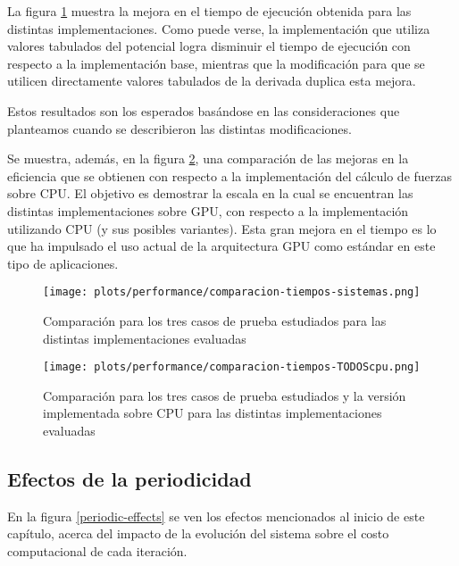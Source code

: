 La figura \ref{time-compare} muestra la mejora en el tiempo de ejecución obtenida para las distintas implementaciones.
Como puede verse, la implementación que utiliza valores tabulados del potencial logra disminuir el tiempo de ejecución con respecto a la implementación base, 
mientras que la modificación para que se utilicen directamente valores tabulados de la derivada duplica esta mejora.

Estos resultados son los esperados basándose en las consideraciones que planteamos cuando se describieron las distintas modificaciones. 

Se muestra, además, en la figura \ref{time-compare-cpu}, una comparación de las mejoras en la eficiencia que se obtienen con respecto a la implementación del cálculo de fuerzas sobre CPU. 
El objetivo es demostrar la escala en la cual se encuentran las distintas implementaciones sobre GPU, con respecto a la implementación utilizando CPU (y sus posibles variantes). 
Esta gran mejora en el tiempo es lo que ha impulsado el uso actual de la arquitectura GPU como estándar en este tipo de aplicaciones.




\begin{figure}[htbp]
\centering
   \texttt{[image: plots/performance/comparacion-tiempos-sistemas.png]}
 \caption{Comparaci\'on para los tres casos de prueba estudiados para las distintas implementaciones evaluadas}
 \label{time-compare}
\end{figure}




\begin{figure}[htbp]
\centering
   \texttt{[image: plots/performance/comparacion-tiempos-TODOScpu.png]}
 \caption{Comparaci\'on para los tres casos de prueba estudiados y la versión implementada sobre CPU para las distintas implementaciones evaluadas}
 \label{time-compare-cpu}
\end{figure}

\subsection{Efectos de la periodicidad}


En la figura \ref{periodic-effects} se ven los efectos mencionados al inicio de este capítulo, acerca del impacto de la evolución del sistema sobre el costo computacional de cada iteración.

